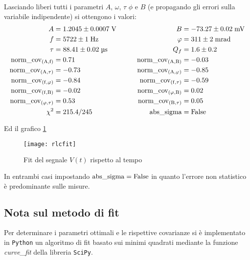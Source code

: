 \documentclass{article}[a4paper, 12pt, italian]
\begin{document}
Lasciando liberi tutti i parametri $A$, $\omega$, $\tau$ $\phi$ e $B$
(e propagando gli errori sulla variabile indipendente) si ottengono i valori:
\begin{align*}
A &= 1.2045 \pm 0.0007  \; \si{\volt} \qquad &B &= -73.27 \pm 0.02 \;
\si{m\volt} \\
f &= 5722 \pm 1 \; \si{\hertz} \qquad &\phi &= 311 \pm 2 \; \si{m\radian} \\  
\tau &= 88.41 \pm 0.02 \; \si{\us} \qquad &Q_f &= 1.6 \pm 0.2 \\
\rm{norm\_cov_{(A, f)}} &= 0.71 \qquad &\rm{norm\_cov_{(A, B)}} &= -0.03 \\
\rm{norm\_cov_{(A, \tau)}} &= -0.73 \qquad &\rm{norm\_cov_{(A, \phi)}} &= -0.85 \\ 
\rm{norm\_cov_{(f, \phi)}} &= -0.84 \qquad &\rm{norm\_cov_{(f, \tau)}} &= -0.59 \\
\rm{norm\_cov_{(f, B)}} &= -0.02 \qquad &\rm{norm\_cov_{(\phi, B)}} &= 0.02 \\
\rm{norm\_cov_{(\phi, \tau)}} &= 0.53 \qquad &\rm{norm\_cov_{(B, \tau)}} &= 0.05 \\
\chi^2 &= 215.4/245 \qquad &\rm{abs\_sigma} &= \rm False
\end{align*}

Ed il grafico \ref{plt:rlcfit}\\
\begin{figure}[!htb]
	\centering 
 		\texttt{[image: rlcfit]}
    \caption{Fit del segnale $V(t)$ rispetto al tempo \label{plt:rlcfit}}
\end{figure}
In entrambi casi impostando $\rm{abs\_sigma} = \rm False$ in quanto l'errore
non statistico è predominante sulle misure.

%

\subsection{Nota sul metodo di fit}
Per determinare i parametri ottimali e le rispettive covarianze si \`e
implementato in \verb+Python+ un algoritmo di fit basato sui minimi quadrati
mediante la funzione \emph{curve\_fit} della libreria 
\texttt{SciPy}\cite{scipy}.
\end{document}

